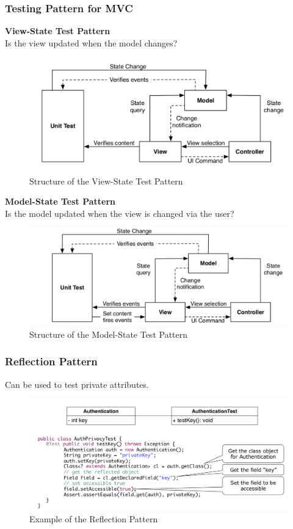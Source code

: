 \subsubsection{Testing Pattern for MVC}
\textbf{View-State Test Pattern}\\
Is the view updated when the model changes?\\
\begin{figure}[H]
  \centering
  \includegraphics[width=\linewidth]{images/testing_pattern_mvc_view_state.png}
  \caption{Structure of the View-State Test Pattern}
\end{figure}
\textbf{Model-State Test Pattern}\\
Is the model updated when the view is changed via the user?\\
\begin{figure}[H]
  \centering
  \includegraphics[width=\linewidth]{images/testing_pattern_mvc_model_state.png}
  \caption{Structure of the Model-State Test Pattern}
\end{figure}
\newpage

\subsubsection{Reflection Pattern}
Can be used to test private attributes.\\
\begin{figure}[h]
  \centering
  \includegraphics[width=\linewidth]{images/testing_pattern_reflection.png}
  \caption{Example of the Reflection Pattern}
\end{figure}
\newpage

